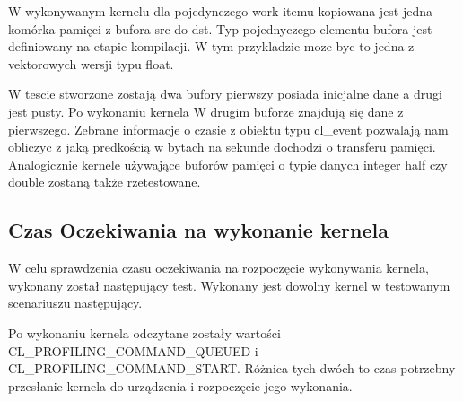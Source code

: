 
 
W wykonywanym kernelu dla pojedynczego work itemu kopiowana jest jedna komórka pamięci z bufora src do dst. Typ pojednyczego elementu bufora jest definiowany na etapie kompilacji. W tym przykladzie moze byc to jedna z vektorowych wersji typu float.

W tescie stworzone zostają dwa bufory pierwszy posiada inicjalne dane a drugi jest pusty. Po wykonaniu kernela W drugim buforze znajdują się dane z pierwszego. Zebrane informacje o czasie z obiektu typu cl\_event pozwalają nam obliczyc z jaką predkością w bytach na sekunde dochodzi o transferu pamięci.
Analogicznie kernele używające buforów pamięci o typie danych integer half czy double zostaną także rzetestowane.

\subsection[Czas Oczekiwania na wykonanie kernela]{Czas Oczekiwania na wykonanie kernela}
W celu sprawdzenia czasu oczekiwania na rozpoczęcie wykonywania kernela, wykonany został następujący test. Wykonany jest dowolny kernel w testowanym scenariuszu następujący.



Po wykonaniu kernela odczytane zostały wartości CL\_PROFILING\_COMMAND\_QUEUED i CL\_PROFILING\_COMMAND\_START. Różnica tych dwóch to czas potrzebny przesłanie kernela do urządzenia i rozpoczęcie jego wykonania.	

